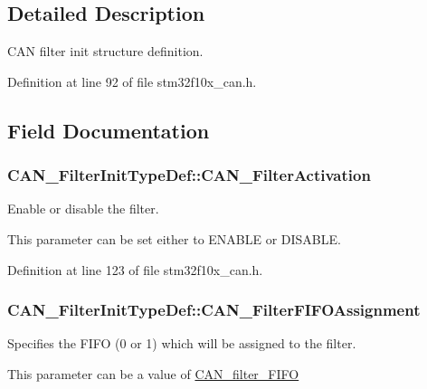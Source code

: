 \subsection{Detailed Description}
C\-A\-N filter init structure definition. 

Definition at line 92 of file stm32f10x\-\_\-can.\-h.



\subsection{Field Documentation}
\hypertarget{struct_c_a_n___filter_init_type_def_a0225afda33b565f358ca75bdaa780074}{
\subsubsection[{C\-A\-N\-\_\-\-Filter\-Activation}]{ C\-A\-N\-\_\-\-Filter\-Init\-Type\-Def\-::\-C\-A\-N\-\_\-\-Filter\-Activation}}\label{struct_c_a_n___filter_init_type_def_a0225afda33b565f358ca75bdaa780074}
\begin{DoxyVerb}  Enable or disable the filter.
\end{DoxyVerb}
 This parameter can be set either to E\-N\-A\-B\-L\-E or D\-I\-S\-A\-B\-L\-E. 

Definition at line 123 of file stm32f10x\-\_\-can.\-h.

\hypertarget{struct_c_a_n___filter_init_type_def_a01ba491f12097adcc9f0a3d627628d55}{
\subsubsection[{C\-A\-N\-\_\-\-Filter\-F\-I\-F\-O\-Assignment}]{ C\-A\-N\-\_\-\-Filter\-Init\-Type\-Def\-::\-C\-A\-N\-\_\-\-Filter\-F\-I\-F\-O\-Assignment}}\label{struct_c_a_n___filter_init_type_def_a01ba491f12097adcc9f0a3d627628d55}
\begin{DoxyVerb}     Specifies the FIFO (0 or 1) which will be assigned to the filter.
\end{DoxyVerb}
 This parameter can be a value of \hyperlink{group___c_a_n__filter___f_i_f_o}{C\-A\-N\-\_\-filter\-\_\-\-F\-I\-F\-O}


